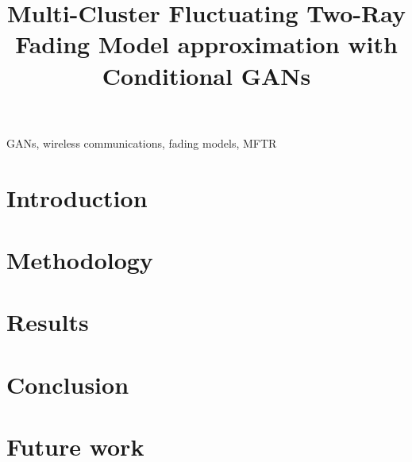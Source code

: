 \documentclass[conference]{IEEEtran}
\begin{document}
\title{Multi-Cluster Fluctuating Two-Ray Fading Model approximation with Conditional GANs}



\maketitle



\begin{IEEEkeywords}
    GANs, wireless communications, fading models, MFTR
\end{IEEEkeywords}

\section{Introduction}


\section{Methodology}


\section{Results}


\section{Conclusion}


\section{Future work}


\nocite{*}
\printbibliography
\end{document}
